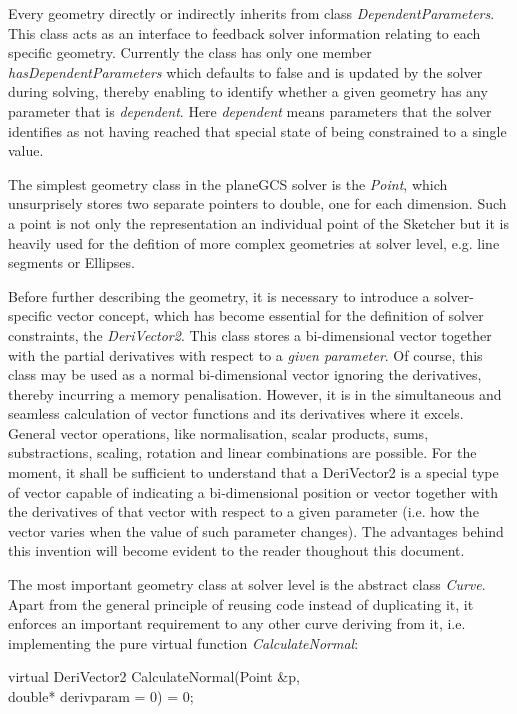 \documentclass[12pt,twoside,a4paper]{book}
\begin{document}
    Every geometry directly or indirectly inherits from class \emph{DependentParameters}. This class acts as an interface to feedback solver information relating to each specific geometry. Currently the class has only one member \emph{hasDependentParameters} which defaults to false and is updated by the solver during solving, thereby enabling to identify whether a given geometry has any parameter that is \emph{dependent}. Here \emph{dependent} means parameters that the solver identifies as not having reached that special state of being constrained to a single value.

    The simplest geometry class in the planeGCS solver is the \emph{Point}, which unsurprisely stores two separate pointers to double, one for each dimension. Such a point is not only the representation an individual point of the Sketcher but it is heavily used for the defition of more complex geometries at solver level, e.g. line segments or Ellipses.

    Before further describing the geometry, it is necessary to introduce a solver-specific vector concept, which has become essential for the definition of solver constraints, the \emph{DeriVector2}. This class stores a bi-dimensional vector together with the partial derivatives with respect to a \emph{given parameter}. Of course, this class may be used as a normal bi-dimensional vector ignoring the derivatives, thereby incurring a memory penalisation. However, it is in the simultaneous and seamless calculation of vector functions and its derivatives where it excels. General vector operations, like normalisation, scalar products, sums, substractions, scaling, rotation and linear combinations are possible. For the moment, it shall be sufficient to understand that a DeriVector2 is a special type of vector capable of indicating a bi-dimensional position or vector together with the derivatives of that vector with respect to a given parameter (i.e. how the vector varies when the value of such parameter changes). The advantages behind this invention will become evident to the reader thoughout this document.

    The most important geometry class at solver level is the abstract class \emph{Curve}. Apart from the general principle of reusing code instead of duplicating it, it enforces an important requirement to any other curve deriving from it, i.e. implementing the pure virtual function \emph{CalculateNormal}:

    \begin{codequote}
    virtual DeriVector2 CalculateNormal(Point \&p, \\ double* derivparam = 0) = 0;
    \end{codequote}
\end{document}
